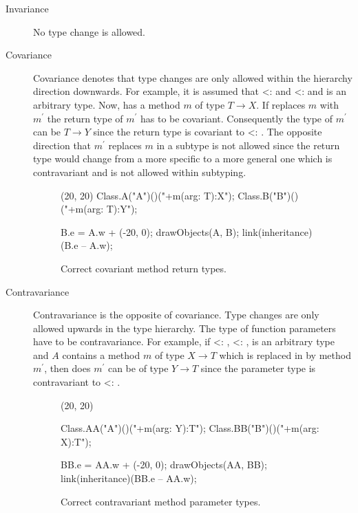 \begin{description}
	\item[Invariance] No type change is allowed.
	\item[Covariance] Covariance denotes that type changes are only
	allowed within the hierarchy direction downwards. For example,
	it is assumed that \B <: \A and \Y <: \X and \T is an arbitrary
	type. Now, \A has a method $m$ of type $T \rightarrow X$. If
	\B replaces $m$ with $m^\prime$ the return type of $m^\prime$
	has to be covariant. Consequently the type of $m^\prime$ can be
	$T \rightarrow Y$ since the return type is covariant to \B <:
	\A. The opposite direction that $m^\prime$ replaces $m$ in a
	subtype is not allowed since the return type would change from
	a more specific to a more general one which is contravariant
	and is not allowed within subtyping.
	\begin{figure}[H]
		\centering
		\begin{emp}[classdiag](20, 20)
			Class.A("A")()("+m(arg: T):X");
			Class.B("B")()("+m(arg: T):Y");

			B.e = A.w + (-20, 0);
			drawObjects(A, B);
			link(inheritance)(B.e -- A.w);
		\end{emp}
		\caption{Correct covariant method return types.}
		\label{fig:covariance}
	\end{figure}

	\item[Contravariance] Contravariance is the opposite of
	covariance. Type changes are only allowed upwards in the
	type hierarchy. The type of function parameters have to be
	contravariance. For example, if \B <: \A, \Y <: \X, \T is
	an arbitrary type and $A$ contains a method $m$ of type $X
	\rightarrow T$ which is replaced in \B by method $m^\prime$,
	then does $m^\prime$ can be of type $Y \rightarrow T$ since the
	parameter type is contravariant to \B <: \A.
	\begin{figure}[H]
		\centering
		\begin{emp}[classdiag](20, 20)

			Class.AA("A")()("+m(arg: Y):T");
			Class.BB("B")()("+m(arg: X):T");

			BB.e = AA.w + (-20, 0);
			drawObjects(AA, BB);
			link(inheritance)(BB.e -- AA.w);

		\end{emp}
		\caption{Correct contravariant method parameter types.}
		\label{fig:contravariance}
	\end{figure}
\end{description}

